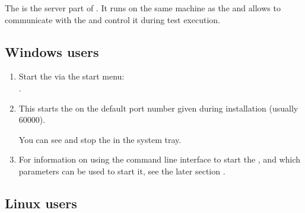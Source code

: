 % 
%
%

\label{otherportnumber}
The \gdagent{} is the server part of \gd{}. It runs on the same machine as the \gdaut{} and allows \gd{} to communicate with the \gdaut{} and control it during test execution. 

\subsection{Windows users}
\begin{enumerate}
\item Start the \gdagent{} via the start menu:\\
. 

\item This starts the \gdserver on the 
default port number given during installation (usually 60000).

You can see and stop the \gdagent{} in the system tray.  

\item  For information on using the command line interface to start the \gdserver, and which parameters can be used to start it, see the later section . 
\end{enumerate}

\subsection{Linux users}

